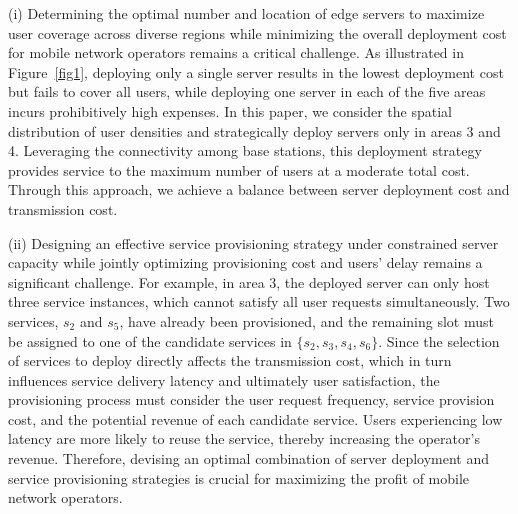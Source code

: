 \documentclass[10pt, conference, letterpaper]{IEEEtran}
\begin{document}
(i) Determining the optimal number and location of edge servers to maximize user coverage across diverse regions while minimizing the overall deployment cost for mobile network operators remains a critical challenge. As illustrated in Figure~\ref{fig1}, deploying only a single server results in the lowest deployment cost but fails to cover all users, while deploying one server in each of the five areas incurs prohibitively high expenses. In this paper, we consider the spatial distribution of user densities and strategically deploy servers only in areas 3 and 4. Leveraging the connectivity among base stations, this deployment strategy provides service to the maximum number of users at a moderate total cost. Through this approach, we achieve a balance between server deployment cost and transmission cost.\par
(ii) Designing an effective service provisioning strategy under constrained server capacity while jointly optimizing provisioning cost and users' delay remains a significant challenge. For example, in area 3, the deployed server can only host three service instances, which cannot satisfy all user requests simultaneously. Two services, $s_{2}$ and $s_{5}$, have already been provisioned, and the remaining slot must be assigned to one of the candidate services in $\{s_{2}, s_{3}, s_{4}, s_{6}\}$. Since the selection of services to deploy directly affects the transmission cost, which in turn influences service delivery latency and ultimately user satisfaction, the provisioning process must consider the user request frequency, service provision cost, and the potential revenue of each candidate service. Users experiencing low latency are more likely to reuse the service, thereby increasing the operator’s revenue. Therefore, devising an optimal combination of server deployment and service provisioning strategies is crucial for maximizing the profit of mobile network operators.
\end{document}
